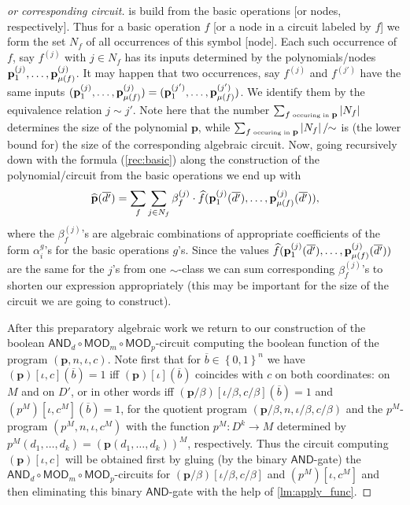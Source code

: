 \documentclass[11pt,a4paper]{amsart}
\newcommand{\set}[1]{{\left\{ {#1} \right\} }}
\newcommand{\card}[1]{\left| #1 \right|}
\newcommand{\po}[1]{{\mathbf {#1}}}
\renewcommand{\o}[1]{\overline {#1}}
\newcommand{\map}{\longrightarrow}
\newcommand{\h}[1]{\widehat{#1}}
\newcommand{\progg}[4]{\left(#1,#2,#3,#4\right)}
\newcommand{\prog}[2]{\left(#1\right)\!\left[#2\right]}
\newcommand{\progb}[3]{\left(#1\right)\!\left[#2,#3\right]}
\newcommand{\true}{1}
\newcommand{\false}{0}
\newcommand{\bool}{\set{\false,\true}}
\newcommand{\ccc}{c}    \newcommand{\s}{s}
\newcommand{\ccand}{\mathsf{AND}}
\newcommand{\ccmod}{\mathsf{MOD}}
\begin{document}
\begin{proof}
[or corresponding circuit] is build from the basic operations [or nodes, respectively].
Thus for a basic operation $f$ [or a node in a circuit labeled by $f$]
we form the set $N_f$ of all occurrences of this symbol [node].
Each such occurrence of $f$, say $f^{(j)}$ with $j\in N_f$ has its inputs determined by the polynomials/nodes $\po p_1^{(j)},\ldots,\po p_{\ar{f}}^{(j)}$.
It may happen that two occurrences, say $f^{(j)}$ and $f^{(j')}$ have the same inputs
$(\po p_1^{(j)},\ldots,\po p_{\ar{f}}^{(j)})=(\po p_1^{(j')},\ldots,\po p_{\ar{f}}^{(j')})$.
We identify them by the equivalence relation $j\sim j'$.
Note here that the number
$\sum_{f \mbox{\tiny \ occuring in\ } \po p} \card{N_f}$
determines the size of the polynomial $\po p$,
while $\sum_{f \mbox{\tiny \ occuring in\ } \po p} \card{N_f}/\!\!\sim$ is (the lower bound for) the size of the corresponding algebraic circuit.
Now, going recursively down with the formula (\ref{rec:basic})
along the construction of the polynomial/circuit from the basic operations we end up with
\[
\h{\po p}(\o{d'}) =
\sum_{f} \sum_{j\in N_f} \beta^{(j)}_f \cdot \h{f}(\po{p}_1^{(j)}(\o{d'}),\ldots,\po{p}_{\ar{f}}^{(j)}(\o{d'})),
\]
where the $\beta^{(j)}_f$'s are algebraic combinations of appropriate coefficients of the form
$\alpha_i^g$'s for the basic operations $g$'s.
Since the values $\h{f}(\po{p}_1^{(j)}(\o{d'}),\ldots,\po{p}_{\ar{f}}^{(j)}(\o{d'}))$
are the same for the $j$'s from one $\sim$-class we can sum corresponding
$\beta^{(j)}_f$'s to shorten our expression appropriately
(this may be important for the size of the circuit we are going to construct).

\medskip
After this preparatory algebraic work we return to our construction of the boolean
$\ccand_d\circ\ccmod_{m}\circ\ccmod_p$-circuit
computing the boolean function of the program
$\progg{\po p}{n}{\iota}{\ccc}$.
Note first that for $\o b\in \bool^n$ we have
$\progb{\po p}{\iota}{\ccc}(\o b)=\true$   iff $\prog{\po p}{\iota}(\o b)$ coincides with $\ccc$ on both coordinates: on $M$ and on $D'$,
or in other words iff $\progb{\po p/\beta}{\iota/\beta}{\ccc/\beta}(\o b)=\true$
and $\progb{p^M}{\iota}{\ccc^M}(\o b)=\true$,
for the quotient program $\progg{\po p/\beta}{n}{\iota/\beta}{\ccc/\beta}$
and the $p^M$-program $\progg{p^M}{n}{\iota}{\ccc^M}$ with the function
$p^M:D^k\map M$ determined by $p^M(d_1,\ldots,d_k)=(\po p(d_1,\ldots,d_k))^M$, respectively.
Thus the circuit computing $\progb{\po p}{\iota}{\ccc}$ will be obtained first by gluing  (by the binary $\ccand$-gate) the $\ccand_d\circ\ccmod_{m}\circ\ccmod_p$-circuits
for $\progb{\po p/\beta}{\iota/\beta}{\ccc/\beta}$ and $\progb{p^M}{\iota}{\ccc^M}$ and then eliminating this binary $\ccand$-gate with the help of \cref{lm:apply_func}.


\end{proof}
\end{document}
